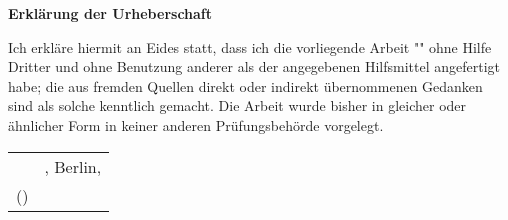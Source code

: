 \thispagestyle{plain} %

{\huge\textbf{Erklärung der Urheberschaft}}
\vspace{1cm}


\Large

Ich erkläre hiermit an Eides statt, dass ich die vorliegende Arbeit "\ttitle" ohne Hilfe
Dritter und ohne Benutzung anderer als der angegebenen Hilfsmittel angefertigt habe;
die aus fremden Quellen direkt oder indirekt übernommenen Gedanken sind als solche
kenntlich gemacht.
Die Arbeit wurde bisher in gleicher oder ähnlicher Form in keiner
anderen Prüfungsbehörde vorgelegt.

\vspace{1cm}
\begin{flushright}
\begin{tabular}{@{} c@{} c}
	\makebox[6cm]{\dotfill}&, Berlin, \submissionDate\\
	(\authorname) & 
\end{tabular}
\end{flushright}
\newpage